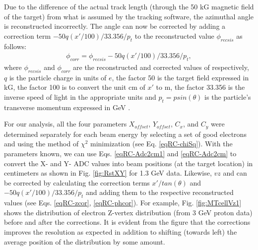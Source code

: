 Due to the difference of the actual track length (through the 50 kG magnetic field of the target) from what is assumed by the tracking software, the azimuthal angle \phs is reconstructed incorrectly. The angle \phs can now be corrected by adding a correction term $- 50 q (x'/100)/33.356/p_t$ to the reconstructed value $\phi_{recsis}$ as follows:
\begin{eqnarray}
\label{eqRC-phcor}
\phi_{corr} = \phi_{recsis} - 50 q (x'/100)/33.356/p_t,
\end{eqnarray}
where $\phi_{recsis}$ and $\phi_{corr}$ are the reconstructed and corrected values of \phs respectively, $q$ is the particle charge in units of $e$, the factor 50 is the target field expressed in kG, the factor 100 is to convert the unit cm of $x'$ to m, the factor 33.356 is the inverse speed of light in the appropriate units and $p_t=p sin(\theta)$ is the particle's transverse momentum expressed in GeV \cite{rstcor_cn}.

For our analysis, all the four parameters $X_{offset}$, $Y_{offset}$, $C_x$, and $C_y$ were determined separately for each beam energy by selecting a set of good electrons and using the method of $\chi^2$ minimization (see Eq. \ref{eqRC-chiSq}). With the parameters known, we can use Eqs. \ref{eqRC-Adc2cm1} and \ref{eqRC-Adc2cm} to convert the X- and Y- ADC values into beam positions (at the target location) in centimeters as shown in Fig. \ref{fig:RstXY} for 1.3 GeV data. Likewise,  $vz$ and \phs can be corrected by calculating the correction terms $x'/tan(\theta)$ and $- 50 q (x'/100)/33.356/p_t$ and adding them to the respective reconstructed values (see Eqs. \ref{eqRC-zcor}, \ref{eqRC-phcor}). For example, Fig. \ref{fig:MTcellVz1} shows the distribution of electron Z-vertex distribution (from 3 GeV proton data) before and after the corrections. It is evident from the figure that the corrections improves the resolution as expected in addition to shifting (towards left) the average position of the distribution by some amount.
